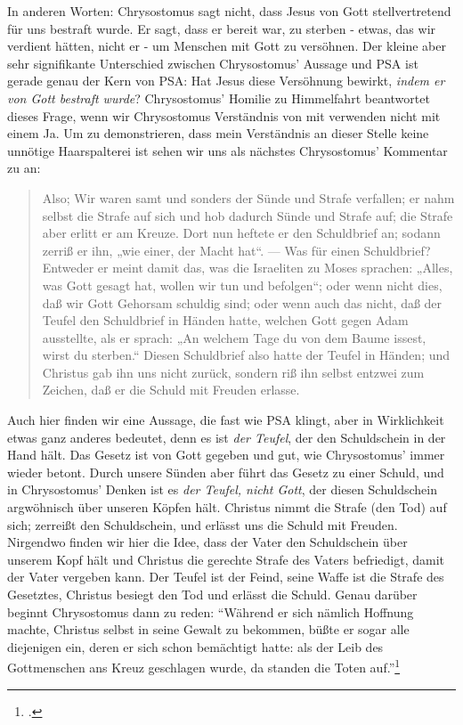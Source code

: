In anderen Worten: Chrysostomus sagt nicht, dass Jesus von Gott stellvertretend für uns bestraft wurde.
Er sagt, dass er bereit war, zu sterben - etwas, das wir verdient hätten, nicht er - um Menschen mit Gott zu versöhnen.
Der kleine aber sehr signifikante Unterschied zwischen Chrysostomus' Aussage und PSA ist gerade genau der Kern von PSA:
Hat Jesus diese Versöhnung bewirkt, \textit{indem er von Gott bestraft wurde}?
Chrysostomus' Homilie zu Himmelfahrt \Cite{chrysostomus-fourth-panegyric} beantwortet dieses Frage, wenn wir Chrysostomus Verständnis von  mit verwenden nicht mit einem Ja.
Um zu demonstrieren, dass mein Verständnis an dieser Stelle keine unnötige Haarspalterei ist sehen wir uns als nächstes Chrysostomus' Kommentar zu  an:
\begin{quote}
	Also; Wir waren samt und sonders der Sünde und Strafe verfallen; er nahm selbst die Strafe auf sich und hob dadurch Sünde und Strafe auf; die Strafe aber erlitt er am Kreuze.
	Dort nun heftete er den Schuldbrief an; sodann zerriß er ihn, „wie einer, der Macht hat“.
	— Was für einen Schuldbrief? Entweder er meint damit das, was die Israeliten zu Moses sprachen:
	„Alles, was Gott gesagt hat, wollen wir tun und befolgen“; oder wenn nicht dies, daß wir Gott Gehorsam schuldig sind; oder wenn auch das nicht, daß der Teufel den Schuldbrief in Händen hatte, welchen Gott gegen Adam ausstellte, als er sprach:
	„An welchem Tage du von dem Baume issest, wirst du sterben.“
	Diesen Schuldbrief also hatte der Teufel in Händen; und Christus gab ihn uns nicht zurück, sondern riß ihn selbst entzwei zum Zeichen, daß er die Schuld mit Freuden erlasse.
\end{quote}
Auch hier finden wir eine Aussage, die fast wie PSA klingt, aber in Wirklichkeit etwas ganz anderes bedeutet, denn es ist \textit{der Teufel}, der den Schuldschein in der Hand hält.
Das Gesetz ist von Gott gegeben und gut, wie Chrysostomus' immer wieder betont.
Durch unsere Sünden aber führt das Gesetz zu einer Schuld, und in Chrysostomus' Denken ist es \textit{der Teufel, nicht Gott}, der diesen Schuldschein argwöhnisch über unseren Köpfen hält.
Christus nimmt die Strafe (den Tod) auf sich; zerreißt den Schuldschein, und erlässt uns die Schuld mit Freuden.
Nirgendwo finden wir hier die Idee, dass der Vater den Schuldschein über unserem Kopf hält und Christus die gerechte Strafe des Vaters befriedigt, damit der Vater vergeben kann.
Der Teufel ist der Feind, seine Waffe ist die Strafe des Gesetztes, Christus besiegt den Tod und erlässt die Schuld.
Genau darüber beginnt Chrysostomus dann zu reden: ``Während er sich nämlich Hoffnung machte, Christus selbst in seine Gewalt zu bekommen, büßte er sogar alle diejenigen ein, deren er sich schon bemächtigt hatte: als der Leib des Gottmenschen ans Kreuz geschlagen wurde, da standen die Toten auf.''\Footcite[6.3]{chrysostomus-col}

